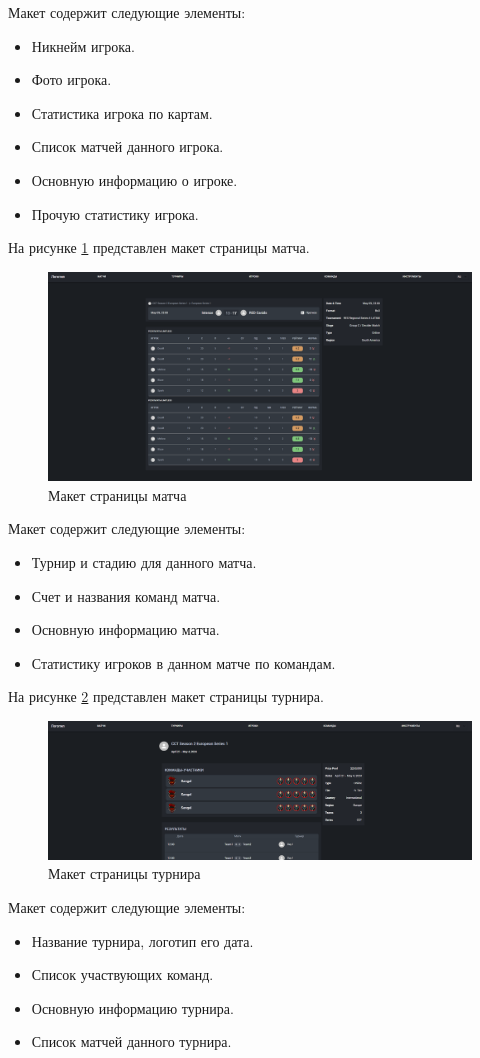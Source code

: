 Макет содержит следующие элементы:
\begin{itemize}
	\item Никнейм игрока.
	\item Фото игрока.
	\item Статистика игрока по картам.
	\item Список матчей данного игрока.
	\item Основную информацию о игроке.
	\item Прочую статистику игрока.
\end{itemize}

На рисунке \ref{fig:-matchPage} представлен макет страницы матча.
\begin{figure}
	\centering
	\includegraphics[width=0.95\linewidth]{"images/Страница матча"}
	\caption{Макет страницы матча}
	\label{fig:-matchPage}
\end{figure}

Макет содержит следующие элементы:
\begin{itemize}
	\item Турнир и стадию для данного матча.
	\item Счет и названия команд матча.
	\item Основную информацию матча.
	\item Статистику игроков в данном матче по командам.
\end{itemize}

На рисунке \ref{fig:-tournamentPage} представлен макет страницы турнира.
\begin{figure}
	\centering
	\includegraphics[width=0.95\linewidth]{"images/Страница турнира"}
	\caption{Макет страницы турнира}
	\label{fig:-tournamentPage}
\end{figure}

Макет содержит следующие элементы:
\begin{itemize}
	\item Название турнира, логотип его дата.
	\item Список участвующих команд.
	\item Основную информацию турнира.
	\item Список матчей данного турнира.
\end{itemize}
